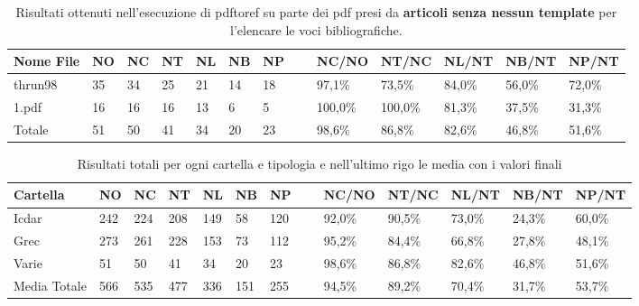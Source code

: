 	\begin{table}\label{tab:articoli}
	\begin{center}
	\begin{tabular}{|l|l|l|l|l|l|l|l|l|l|l|l|l|} \hline
Nome File & NO & NC & NT & NL & NB & NP & ~ & NC/NO & NT/NC & NL/NT & NB/NT & NP/NT \\ \hline
thrun98 & 35 & 34 & 25 & 21 & 14 & 18 & ~ & 97,1\% & 73,5\% & 84,0\% & 56,0\% & 72,0\%\\
1.pdf & 16 & 16 & 16 & 13 & 6 & 5 & ~ & 100,0\% & 100,0\% & 81,3\% & 37,5\% & 31,3\%\\ \hline
Totale & 51 & 50 & 41 & 34 & 20 & 23 & ~ & 98,6\% & 86,8\% & 82,6\% & 46,8\% & 51,6\%\\ \hline
	\end{tabular}
	\tiny{\caption{Risultati ottenuti nell'esecuzione di pdftoref su parte dei pdf presi da \textbf{articoli senza nessun template} per l'elencare le voci bibliografiche.}}
	\end{center}
	\end{table}
	
		\begin{table}\label{tab:totale}
	\begin{center}
	\begin{tabular}{|l|l|l|l|l|l|l|l|l|l|l|l|l|} \hline
	Cartella & NO & NC & NT & NL & NB & NP & ~ & NC/NO & NT/NC & NL/NT & NB/NT & NP/NT \\ \hline
	Icdar & 242 & 224 & 208 & 149 & 58 & 120 & ~ & 92,0\% & 90,5\% & 73,0\% & 24,3\% & 60,0\%\\ 
	Grec & 273 & 261 & 228 & 153 & 73 & 112 & ~ & 95,2\% & 84,4\% & 66,8\% & 27,8\% & 48,1\%\\
	Varie & 51 & 50 & 41 & 34 & 20 & 23 & ~ & 98,6\% & 86,8\% & 82,6\% & 46,8\% & 51,6\%\\ \hline
	Media Totale & 566 &	535	 & 477 &	336 &	151 & 	255 & ~ & 94,5\% & 89,2\% &	70,4\% & 31,7\% & 53,7\% \\ \hline

	\end{tabular}
	\tiny{\caption{Risultati totali per ogni cartella e tipologia e nell'ultimo rigo le media con i valori finali}}
	\end{center}
	\end{table}
	

